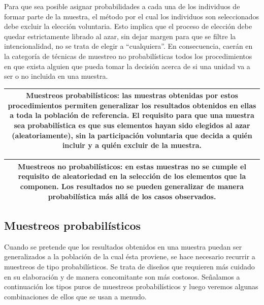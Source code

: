 \documentclass[]{article}
\begin{document}
Para que sea posible asignar probabilidades a cada una de los individuos
de formar parte de la muestra, el método por el cual los individuos son
seleccionados debe excluir la elección voluntaria. Esto implica que el
proceso de elección debe quedar estrictamente librado al azar, sin dejar
margen para que se filtre la intencionalidad, no se trata de elegir a
``cualquiera''. En consecuencia, caerán en la categoría de técnicas de
muestreo no probabilísticas todos los procedimientos en que exista
alguien que pueda tomar la decisión acerca de si una unidad va a ser o
no incluida en una muestra.

\begin{longtable}[]{@{}c@{}}
\toprule
\endhead
\begin{minipage}[t]{0.97\columnwidth}\centering
\textbf{Muestreos probabilísticos}: las muestras obtenidas por estos procedimientos permiten generalizar los resultados obtenidos en ellas a toda la población de referencia. El requisito para que una muestra sea probabilística es que sus elementos hayan sido elegidos al azar (aleatoriamente), sin la participación voluntaria que decida a quién incluir y a quién excluir de la muestra.\strut
\end{minipage}\tabularnewline
\bottomrule
\end{longtable}

\begin{longtable}[]{@{}c@{}}
\toprule
\endhead
\begin{minipage}[t]{0.97\columnwidth}\centering
\textbf{Muestreos no probabilísticos}: en estas muestras no se cumple el requisito de aleatoriedad en la selección de los elementos que la componen. Los resultados no se pueden generalizar de manera probabilística más allá de los casos observados.\strut
\end{minipage}\tabularnewline
\bottomrule
\end{longtable}

\hypertarget{muestreos-probabilisticos}{%
\subsection{Muestreos probabilísticos}\label{muestreos-probabilisticos}}

Cuando se pretende que los resultados obtenidos en una muestra puedan
ser generalizados a la población de la cual ésta proviene, se hace
necesario recurrir a muestreos de tipo probabilísticos. Se trata de
diseños que requieren más cuidado en su elaboración y de manera
concomitante son más costosos. Señalamos a continuación los tipos puros
de muestreos probabilísticos y luego veremos algunas combinaciones de
ellos que se usan a menudo.
\end{document}
